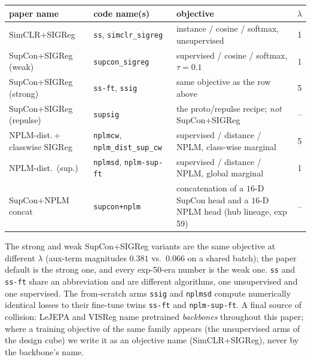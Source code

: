 \documentclass{article}
\begin{document}
\begin{center}\footnotesize\setlength{\tabcolsep}{4pt}
\begin{tabular}{llp{1.9in}c}
\toprule
paper name & code name(s) & objective & $\lambda$ \\
\midrule
SimCLR+SIGReg & \texttt{ss}, \texttt{simclr\_sigreg} & instance / cosine / softmax, unsupervised & 1 \\
SupCon+SIGReg (weak) & \texttt{supcon\_sigreg} & supervised / cosine / softmax, $\tau{=}0.1$ & 1 \\
SupCon+SIGReg (strong) & \texttt{ss-ft}, \texttt{ssig} & same objective as the row above & 5 \\
SupCon+SIGReg (repulse) & \texttt{supsig} & the proto/repulse recipe; \emph{not} SupCon+SIGReg & -- \\
NPLM-dist.\,+\,classwise SIGReg & \texttt{nplmcw}, \texttt{nplm\_dist\_sup\_cw} & supervised / distance / NPLM, class-wise marginal & 5 \\
NPLM-dist.\ (sup.) & \texttt{nplmsd}, \texttt{nplm-sup-ft} & supervised / distance / NPLM, global marginal & 1 \\
SupCon$+$NPLM concat & \texttt{supcon+nplm} & concatenation of a $16$-D SupCon head and a $16$-D NPLM head (hub lineage, exp 59) & -- \\
\bottomrule
\end{tabular}
\end{center}

\noindent The strong and weak SupCon+SIGReg variants are the same objective
at different $\lambda$ (aux-term magnitudes $0.381$ vs.\ $0.066$ on a shared
batch); the paper default is the strong one, and every exp-50-era
number is the weak one. \texttt{ss} and \texttt{ss-ft} share an abbreviation
and are different algorithms, one unsupervised and one supervised. The
from-scratch arms \texttt{ssig} and \texttt{nplmsd} compute numerically
identical losses to their fine-tune twins \texttt{ss-ft} and
\texttt{nplm-sup-ft}. A final source of collision: LeJEPA and VISReg name
pretrained \emph{backbones} throughout this paper; where a training
objective of the same family appears (the unsupervised arms of the design
cube) we write it as an objective name (SimCLR+SIGReg), never by the
backbone's name.
\end{document}
